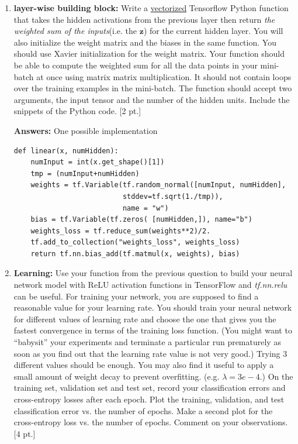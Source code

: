 \documentclass[12pt,letterpaper]{article}
\begin{document}
\begin{enumerate}
  \item  \textbf{layer-wise building block:} Write a \underline{vectorized} Tensorflow Python function that takes the hidden activations from the previous layer then return \textit{the weighted sum of the inputs}(i.e. the $\mathbf{z}$) for the current hidden layer. You will also initialize the weight matrix and the biases in the same function. You should use Xavier initialization for the weight matrix. Your function should be able to compute the weighted sum for all the data points in your mini-batch at once using matrix matrix multiplication. It should not contain loops over the training examples in the mini-batch. The function should accept two arguments, the input tensor and the number of the hidden units. Include the snippets of the Python code. [2 pt.]

{\color{red}
  \textbf{Answers:}
  One possible implementation
}
\begin{verbatim}
def linear(x, numHidden):
    numInput = int(x.get_shape()[1])
    tmp = (numInput+numHidden)
    weights = tf.Variable(tf.random_normal([numInput, numHidden], 
                          stddev=tf.sqrt(1./tmp)), 
                          name = "w")
    bias = tf.Variable(tf.zeros( [numHidden,]), name="b")
    weights_loss = tf.reduce_sum(weights**2)/2.
    tf.add_to_collection("weights_loss", weights_loss)
    return tf.nn.bias_add(tf.matmul(x, weights), bias)
\end{verbatim}
  \item  \textbf{Learning:} Use your function from the previous question to build your neural network model with ReLU activation functions in TensorFlow and \textit{tf.nn.relu} can be useful. For training your network, you are supposed to find a reasonable value for your learning rate. You should train your neural network for different values of learning rate and choose the one that gives you the fastest convergence in terms of the training loss function. (You might want to ``babysit'' your experiments and terminate a particular run prematurely as soon as you find out that the learning rate value is not very good.) Trying 3 different values should be enough. You may also find it useful to apply a small amount of weight decay to prevent overfitting. (e.g. $\lambda = 3e-4$.) On the training set, validation set and test set, record your classification errors and cross-entropy losses after each epoch. Plot the training, validation, and test classification error vs. the number of epochs. Make a second plot for the cross-entropy loss vs. the number of epochs. Comment on your observations. [4 pt.]


\end{enumerate}
\end{document}
